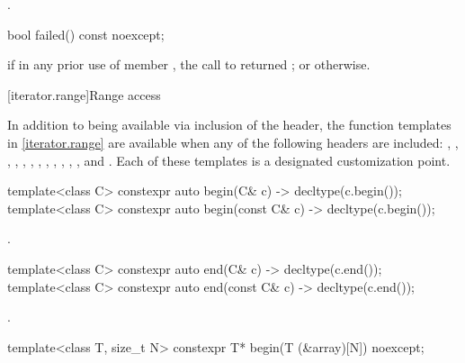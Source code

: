 \begin{itemdescr}
\pnum
\returns
{}.
\end{itemdescr}

%
\begin{itemdecl}
bool failed() const noexcept;
\end{itemdecl}

\begin{itemdescr}
\pnum
\returns
{}
if in any prior use of member
,
the call to
returned
;
or
otherwise.
\end{itemdescr}

[iterator.range]{Range access}

\pnum
In addition to being available via inclusion of the  header,
the function templates in \ref{iterator.range} are available when any of the following
headers are included: , , ,
, , , , , ,
, , , and .
Each of these templates
is a designated customization point.

%
\begin{itemdecl}
template<class C> constexpr auto begin(C& c) -> decltype(c.begin());
template<class C> constexpr auto begin(const C& c) -> decltype(c.begin());
\end{itemdecl}

\begin{itemdescr}
\pnum
\returns {}.
\end{itemdescr}

%
\begin{itemdecl}
template<class C> constexpr auto end(C& c) -> decltype(c.end());
template<class C> constexpr auto end(const C& c) -> decltype(c.end());
\end{itemdecl}

\begin{itemdescr}
\pnum
\returns {}.
\end{itemdescr}

%
\begin{itemdecl}
template<class T, size_t N> constexpr T* begin(T (&array)[N]) noexcept;
\end{itemdecl}

